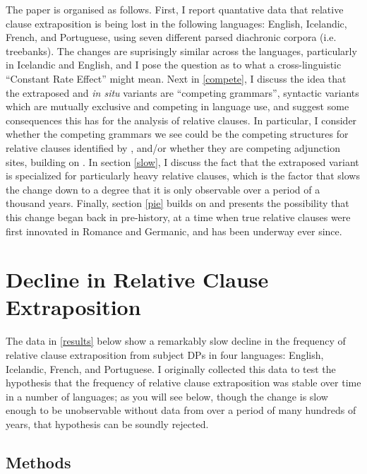 The paper is organised as follows.
First, I report quantative data that relative clause extraposition is being lost in the following languages: English, Icelandic, French, and Portuguese, using seven different parsed diachronic corpora (i.e. treebanks).
The changes are suprisingly similar across the languages, particularly in Icelandic and English, and I pose the question as to what a cross-linguistic ``Constant Rate Effect'' \citep{kroch1989} might mean.
Next in \ref{compete}, I discuss the idea that the extraposed and \textsl{in situ} variants are ``competing grammars'', syntactic variants which are mutually exclusive and competing in language use, and suggest some consequences this has for the analysis of relative clauses. In particular, I consider whether the competing grammars we see could be the competing structures for relative clauses identified by \citet{sauerland2003}, and/or whether they are competing adjunction sites, building on \citet{culicoverrochemont1990}.
In section \ref{slow}, I discuss the fact that the extraposed variant is specialized for particularly heavy relative clauses, which is the factor that slows the change down to a degree that it is only observable over a period of a thousand years.
Finally, section \ref{pie} builds on \citet{kiparsky1995} and presents the possibility that this change began back in pre-history, at a time when true relative clauses were first innovated in Romance and Germanic, and has been underway ever since.



\section{Decline in Relative Clause Extraposition}
\label{relclause}

The data in \ref{results} below show a remarkably slow decline in the frequency of relative clause extraposition from subject DPs in four languages: English, Icelandic, French, and Portuguese. I originally collected this data to test the hypothesis that the frequency of relative clause extraposition was stable over time in a number of languages; as you will see below, though the change is slow enough to be unobservable without data from over a period of many hundreds of years, that hypothesis can be soundly rejected.

\subsection{Methods}
\label{methods}

